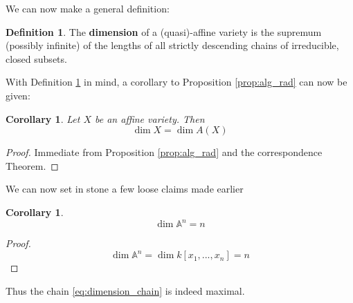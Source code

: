\documentclass[12pt]{article}
\theoremstyle{plain}
\newtheorem{cor}[thm]{Corollary}
\theoremstyle{definition}
\newtheorem{defn}[thm]{Definition} %
\newcommand{\bb}[1]{\mathbb{#1}}
\begin{document}
We can now make a general definition:
\begin{defn}\label{def:dimension_var}
The \textbf{dimension} of a (quasi)-affine variety is the supremum (possibly infinite) of the lengths of all strictly descending chains of irreducible, closed subsets.
\end{defn}
With Definition \ref{def:dimension_var} in mind, a corollary to Proposition \ref{prop:alg_rad} can now be given:
\begin{cor}
Let $X$ be an affine variety. Then
\begin{equation}
    \operatorname{dim}X = \operatorname{dim}A(X)
\end{equation}
\end{cor}\label{cor:dimension}
\begin{proof}
Immediate from Proposition \ref{prop:alg_rad} and the correspondence Theorem.
\end{proof}
We can now set in stone a few loose claims made earlier
\begin{cor}
$$\operatorname{dim}\bb{A}^n = n$$
\end{cor}
\begin{proof}
\begin{equation}
    \operatorname{dim}\bb{A}^n = \operatorname{dim}k[x_1,...,x_n] = n
\end{equation}
\end{proof}
Thus the chain \eqref{eq:dimension_chain} is indeed maximal.
\end{document}
